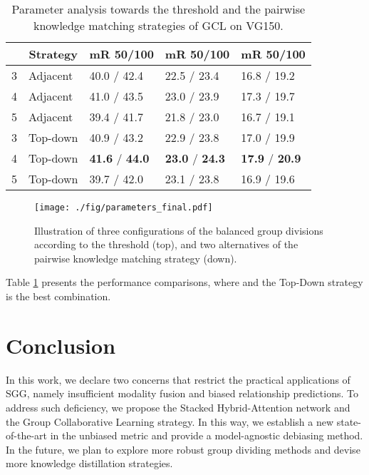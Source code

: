 \documentclass[10pt,twocolumn,letterpaper]{article}
\begin{document}
{\begin{table}
\begin{tabular}{p{0.4cm}<{\centering}|p{1.4cm}<{\centering}|p{1.4cm}<{\centering}|p{1.4cm}<{\centering}|p{1.4cm}<{\centering}}
		\hline
		\multicolumn{1}{c|}{} & \multicolumn{1}{c|}{Strategy} & \multicolumn{1}{c|}{mR 50/100} & \multicolumn{1}{c|}{mR 50/100} & \multicolumn{1}{c}{mR 50/100} \\ \hline
		3 & Adjacent &40.0 / 42.4 & 22.5 / 23.4  & 16.8 / 19.2    \\
		4 & Adjacent &41.0 / 43.5 &23.0 / 23.9  &17.3 / 19.7   \\
		5 & Adjacent &39.4 / 41.7   & 21.8 / 23.0   & 16.7 / 19.1    \\\hline
		3 & Top-down &40.9 / 43.2   &22.9 / 23.8  &17.0 / 19.9   \\
		4 & Top-down &\textbf{41.6} / \textbf{44.0} &\textbf{23.0} / \textbf{24.3}  &\textbf{17.9} / \textbf{20.9}  \\
		5 & Top-down &39.7 / 42.0   &23.1 / 23.8  &16.9 / 19.6   \\
		 \hline
	\end{tabular}
\vspace{0.02cm}
\caption{Parameter analysis towards the threshold  and the pairwise knowledge matching strategies of GCL on VG150.}
\vspace{-0.2cm}
\label{result_PA}
\end{table}

\begin{figure}[t]
	\centering
	\texttt{[image: ./fig/parameters\_final.pdf]}
	\vspace{-0.5cm}
	\caption{Illustration of three configurations of the balanced group divisions according to the threshold  (top), and two alternatives of the pairwise knowledge matching strategy (down).}
	\vspace{-0.4cm}
	\label{parameters}
\end{figure}


Table \ref{result_PA} presents the performance comparisons, where  and the Top-Down strategy is the best combination. 






\section{Conclusion}



In this work, we declare two concerns that restrict the practical applications of SGG, namely insufficient modality fusion and biased relationship predictions. To address such deficiency, we propose the Stacked Hybrid-Attention network and the Group Collaborative Learning strategy. In this way, we establish a new state-of-the-art in the unbiased metric and provide a model-agnostic debiasing method. In the future, we plan to explore more robust group dividing methods and devise more knowledge distillation strategies.

}
\end{document}
